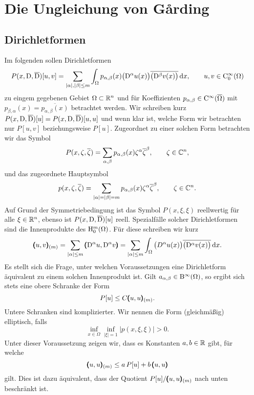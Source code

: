 \chapter{Die Ungleichung von G\r{a}rding}

\section{Dirichletformen}
Im folgenden sollen Dirichletformen 
\begin{equation}
   P(x,\mathrm D,\overline{\mathrm D})[u,v] = \sum_{|\alpha|,|\beta|\le m} \int_\Omega p_{\alpha,\beta}(x) \big(\mathrm D^\alpha u(x)\big) \overline{\big(\mathrm D^\beta v(x)\big)} \,\mathrm d x,\qquad u,v\in\mathrm C_0^\infty(\Omega)
\end{equation}
zu eingem gegebenen Gebiet $\Omega\subset\mathbb R^n$ und für Koeffizienten $p_{\alpha,\beta}\in\mathrm C^\infty(\overline{\Omega})$ mit $p_{\beta,\alpha}(x)=\overline{p_{\alpha,\beta}(x)}$  betrachtet werden. Wir schreiben kurz $P(x,\mathrm D,\overline{\mathrm D})[u]=P(x,\mathrm D,\overline{\mathrm D})[u,u]$ und wenn klar ist, welche Form wir betrachten nur $P[u,v]$ beziehungsweise $P[u]$. Zugeordnet zu einer solchen Form betrachten wir das Symbol
\begin{equation}
   P(x,\zeta,\overline\zeta) = \sum_{\alpha,\beta} p_{\alpha,\beta}(x) \zeta^\alpha\overline\zeta^\beta,\qquad \zeta\in\mathbb C^n,
\end{equation}
und das zugeordnete Hauptsymbol
\begin{equation}
   p(x,\zeta,\overline\zeta) = \sum_{|\alpha|=|\beta|=m} p_{\alpha,\beta}(x) \zeta^\alpha\overline\zeta^\beta,\qquad \zeta\in\mathbb C^n.
\end{equation}
Auf Grund der Symmetriebedingung ist das Symbol $P(x,\xi,\xi)$ reellwertig f\"ur alle $\xi\in\mathbb R^n$, ebenso ist 
$P(x,\mathrm D,\overline {\mathrm D})[u]$ reell. Spezialfälle solcher Dirichletformen sind die Innenprodukte des $\mathrm H^m_0(\Omega)$. Für diese schreiben wir kurz
\begin{equation}
  \pmb(u,v\pmb)_{(m)} = \sum_{|\alpha|\le m} \pmb(\mathrm D^\alpha u,\mathrm D^\alpha v\pmb) = \sum_{|\alpha|\le m} \int_\Omega   \big(D^\alpha u(x)\big) \overline{\big(\mathrm D^\alpha v(x)\big)} \,\mathrm d x.
\end{equation}
Es stellt sich die Frage, unter welchen Voraussetzungen eine Dirichletform äquivalent zu einem solchen Innenprodukt ist. Gilt $a_{\alpha,\beta}\in \mathrm B^\infty(\Omega)$, so ergibt sich stets eine obere Schranke der Form
\begin{equation}
    P[u] \le C \pmb(u,u\pmb)_{(m)}.
\end{equation}
Untere Schranken sind komplizierter. Wir nennen die Form (gleichmäßig) elliptisch, falls 
\begin{equation}
  \inf_{x\in\Omega}  \inf_{|\xi|=1} |p(x,\xi,\xi)| > 0.
\end{equation}
Unter dieser Voraussetzung zeigen wir, dass es Konstanten $a,b\in\mathbb R$ gibt, für welche
\begin{equation} 
   \pmb(u,u\pmb)_{(m)} \le a\, P[u] + b\, \pmb(u,u\pmb)
\end{equation}
gilt. Dies ist dazu äquivalent, dass der Quotient $P [u]  / \pmb(u,u\pmb)_{(m)}$ nach unten beschränkt ist.

